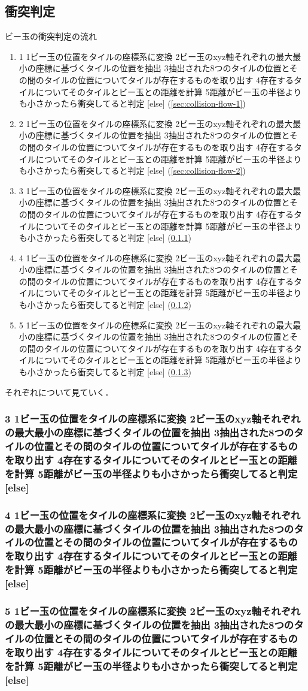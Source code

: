 
{%
\makeatletter

\newcommand{\sec@collision@flow}[1]{%
  \stringcases
    {#1}%
    {%
      {1}{ビー玉の位置をタイルの座標系に変換}%
      {2}{ビー玉のxyz軸それぞれの最大最小の座標に基づくタイルの位置を抽出}%
      {3}{抽出された8つのタイルの位置とその間のタイルの位置についてタイルが存在するものを取り出す}%
      {4}{存在するタイルについてそのタイルとビー玉との距離を計算}%
      {5}{距離がビー玉の半径よりも小さかったら衝突してると判定}%
    }%
    {[else]}%
}

\newcommand{\e}{\bm{e}}

\newcommand{\e@x}{\e_x}
\newcommand{\e@y}{\e_y}
\newcommand{\e@z}{\e_z}

\newcommand{\e@tile}{\e^\prime}
\newcommand{\e@tile@x}{\e@tile_x}
\newcommand{\e@tile@y}{\e@tile_y}
\newcommand{\e@tile@z}{\e@tile_z}

\newcommand{\O@tile}{{\rm O}^\prime}

\newcommand{\v@O@tile}{\bm{v}_{\O@tile}}

\newcommand{\v@P}{\bm{v}_{\rm P}}
\newcommand{\v@tile@P}{\bm{v}^\prime_{\rm P}}
\subsection{衝突判定}

\begin{center}
  
\end{center}

ビー玉の衝突判定の流れ

\begin{enumerate}
  \item \sec@collision@flow{1} (\ref{sec:collision-flow-1})
  \item \sec@collision@flow{2} (\ref{sec:collision-flow-2})
  \item \sec@collision@flow{3} (\ref{sec:collision-flow-3})
  \item \sec@collision@flow{4} (\ref{sec:collision-flow-4})
  \item \sec@collision@flow{5} (\ref{sec:collision-flow-5})
\end{enumerate}

それぞれについて見ていく．






\subsubsection{\sec@collision@flow{3}}
\label{sec:collision-flow-3}

\subsubsection{\sec@collision@flow{4}}
\label{sec:collision-flow-4}

\subsubsection{\sec@collision@flow{5}}
\label{sec:collision-flow-5}

\makeatother
}
